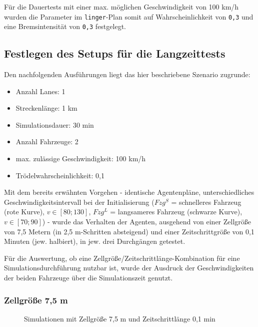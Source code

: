 Für die Dauertests mit einer max. möglichen Geschwindigkeit von 100 km/h wurden die Parameter im \texttt{linger}-Plan somit auf Wahrscheinlichkeit von \texttt{0,3} und eine Bremsintensität von \texttt{0,3} festgelegt.





\subsection{Festlegen des Setups für die Langzeittests}
\label{setup-multilane-scenarios}

Den nachfolgenden Ausführungen liegt das hier beschriebene Szenario zugrunde:
\begin{itemize}
\itemsep0em
	\item Anzahl Lanes: 1
	\item Streckenlänge: 1 km
	\item Simulationsdauer: 30 min
	\item Anzahl Fahrzeuge: 2
	\item max. zulässige Geschwindigkeit: 100 km/h
	\item Trödelwahrscheinlichkeit: 0,1
\end{itemize}
Mit dem bereits erwähnten Vorgehen - identische Agentenpläne, unterschiedliches Geschwindigkeitsintervall bei der Initialisierung ($ Fzg^{S} $ = schnelleres Fahrzeug (rote Kurve), $ v \in [80; 130] $, $ Fzg^{L} $ = langsameres Fahrzeug (schwarze Kurve), $ v \in [70; 90] $) - wurde das Verhalten der Agenten, ausgehend von einer Zellgröße von 7,5 Metern (in 2,5 m-Schritten absteigend) und einer Zeitschrittgröße von 0,1 Minuten (jew. halbiert), in jew. drei Durchgängen getestet.

Für die Auswertung, ob eine Zellgröße/Zeitschrittlänge-Kombination für eine Simulationsdurchführung nutzbar ist, wurde der Ausdruck der Geschwindigkeiten der beiden Fahrzeuge über die Simulationszeit genutzt.


\subsubsection{Zellgröße 7,5 m}

\begin{figure}[hptb]
  \centering 
   \qquad 
   \qquad 
  \caption{Simulationen mit Zellgröße 7,5 m und Zeitschrittlänge 0,1 min} 
  \label{figure:run1-3}
\end{figure}

